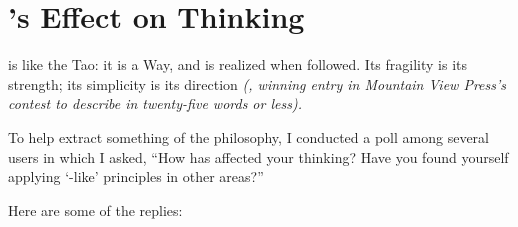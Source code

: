 \epilog{}
\chapter{%
\Forth{}'s Effect
on Thinking}
\begin{tfquot}
\Forth{} is like the Tao: it is a Way, and is realized when followed.  Its
fragility is its strength; its simplicity is its direction
\emph{(, winning entry in Mountain View Press's
contest to describe \Forth{} in twenty-five words or less).}
\end{tfquot}

To help extract something of the \Forth{} philosophy, I conducted a poll
among several \Forth{} users in which I asked, ``How has \Forth{} affected
your thinking?  Have you found yourself applying `\Forth{}-like' 
principles in other areas?''

Here are some of the replies:

